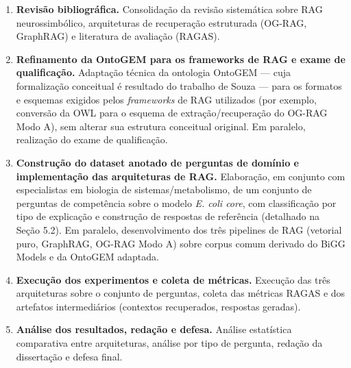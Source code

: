 \documentclass{article}
\begin{document}
	\begin{enumerate}
		\item \textbf{Revisão bibliográfica.} Consolidação da revisão sistemática sobre RAG neurossimbólico, arquiteturas de recuperação estruturada (OG-RAG, GraphRAG) e literatura de avaliação (RAGAS).
		\item \textbf{Refinamento da OntoGEM para os frameworks de RAG e exame de qualificação.} Adaptação técnica da ontologia OntoGEM \cite{souza2025ontogem} --- cuja formalização conceitual é resultado do trabalho de Souza \cite{souza2025ontogem} --- para os formatos e esquemas exigidos pelos \textit{frameworks} de RAG utilizados (por exemplo, conversão da OWL para o esquema de extração/recuperação do OG-RAG Modo A), sem alterar sua estrutura conceitual original. Em paralelo, realização do exame de qualificação.
		\item \textbf{Construção do dataset anotado de perguntas de domínio e implementação das arquiteturas de RAG.} Elaboração, em conjunto com especialistas em biologia de sistemas/metabolismo, de um conjunto de perguntas de competência sobre o modelo \textit{E. coli core}, com classificação por tipo de explicação e construção de respostas de referência (detalhado na Seção 5.2). Em paralelo, desenvolvimento dos três pipelines de RAG (vetorial puro, GraphRAG, OG-RAG Modo A) sobre corpus comum derivado do BiGG Models e da OntoGEM adaptada.
		\item \textbf{Execução dos experimentos e coleta de métricas.} Execução das três arquiteturas sobre o conjunto de perguntas, coleta das métricas RAGAS e dos artefatos intermediários (contextos recuperados, respostas geradas).
		\item \textbf{Análise dos resultados, redação e defesa.} Análise estatística comparativa entre arquiteturas, análise por tipo de pergunta, redação da dissertação e defesa final.
	\end{enumerate}
	
\end{document}
